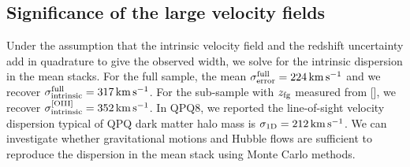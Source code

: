 \documentclass[iop]{emulateapj}
\begin{document}

\subsection{Significance of the large velocity fields}
\label{sec:significance_width}

Under the assumption that the intrinsic velocity field and the redshift uncertainty add in 
quadrature to give the observed width, we solve for the intrinsic dispersion in the  
mean stacks. For the full sample, the mean $\sigma_{\rm error}^{\rm full}=224\,{\rm km\,s^{-1}}$ 
and we recover $\sigma_{\rm intrinsic}^{\rm full}=317\,{\rm km\,s^{-1}}$. For the sub-sample with 
$z_{\rm fg}$ measured from [], we recover 
$\sigma_{\rm intrinsic}^{\rm [OIII]}=352\,{\rm km\,s^{-1}}$. In QPQ8, we reported the 
line-of-sight velocity dispersion typical of QPQ dark matter halo mass is 
$\sigma_{\rm 1D}=212\,{\rm km\,s^{-1}}$. We can investigate whether gravitational motions and 
Hubble flows are sufficient to reproduce the dispersion in the  mean stack using Monte 
Carlo methods. 
\end{document}
